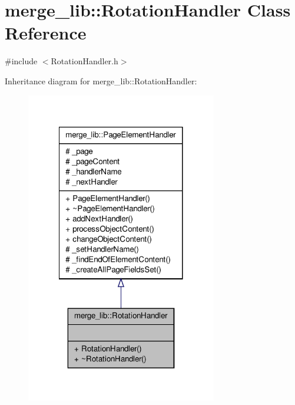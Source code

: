 \hypertarget{classmerge__lib_1_1_rotation_handler}{\section{merge\-\_\-lib\-:\-:Rotation\-Handler Class Reference}
\label{db/d07/classmerge__lib_1_1_rotation_handler}
}


{\ttfamily \#include $<$Rotation\-Handler.\-h$>$}



Inheritance diagram for merge\-\_\-lib\-:\-:Rotation\-Handler\-:
\nopagebreak
\begin{figure}[H]
\begin{center}
\leavevmode
\includegraphics[width=236pt]{df/d39/classmerge__lib_1_1_rotation_handler__inherit__graph}
\end{center}
\end{figure}


